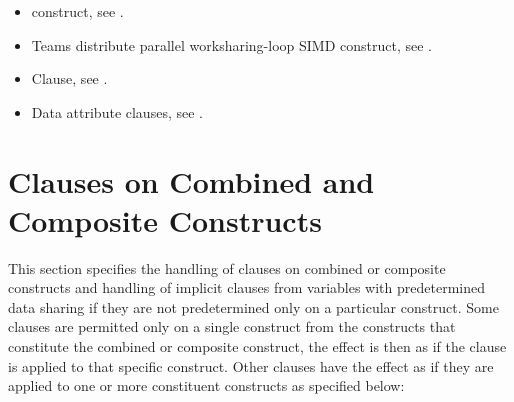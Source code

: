 \crossreferences
\begin{itemize}
\item {} construct, see .

\item Teams distribute parallel worksharing-loop SIMD construct, see
      .

\item {} Clause, see .

\item Data attribute clauses, see
      .
\end{itemize}











\section{Clauses on Combined and Composite Constructs}
\label{sec:Clauses on Combined and Composite Constructs}
This section specifies the handling of clauses on combined or composite constructs and handling of implicit clauses from
variables with predetermined data sharing if they are not predetermined only on a particular construct.
Some clauses are permitted only on a single construct from the constructs that
constitute the combined or composite construct, the effect is then as if the
clause is applied to that specific construct.  Other clauses have the effect as if
they are applied to one or more constituent constructs as specified below:

